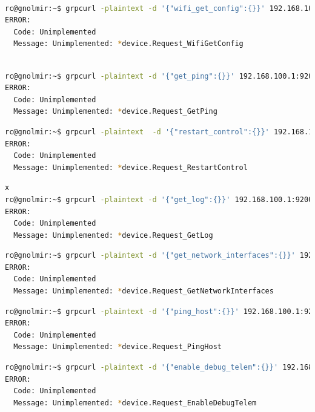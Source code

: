 \documentclass[IN,11pt,twoside,openright,bachelor,english]{tumthesis}
\begin{document}
\begin{lstlisting}[language=bash,basicstyle=\tiny]

rc@gnolmir:~$ grpcurl -plaintext -d '{"wifi_get_config":{}}' 192.168.100.1:9200 SpaceX.API.Device.Device/Handle
ERROR:
  Code: Unimplemented
  Message: Unimplemented: *device.Request_WifiGetConfig
\end{lstlisting}
\begin{lstlisting}[language=bash,basicstyle=\tiny]
 
rc@gnolmir:~$ grpcurl -plaintext -d '{"get_ping":{}}' 192.168.100.1:9200 SpaceX.API.Device.Device/Handle
ERROR:
  Code: Unimplemented
  Message: Unimplemented: *device.Request_GetPing
\end{lstlisting}

\begin{lstlisting}[language=bash,basicstyle=\tiny]
rc@gnolmir:~$ grpcurl -plaintext  -d '{"restart_control":{}}' 192.168.100.1:9200 SpaceX.API.Device.Device/Handle
ERROR:
  Code: Unimplemented
  Message: Unimplemented: *device.Request_RestartControl
\end{lstlisting}

\begin{lstlisting}[language=bash,basicstyle=\tiny]x
rc@gnolmir:~$ grpcurl -plaintext -d '{"get_log":{}}' 192.168.100.1:9200 SpaceX.API.Device.Device/Handle
ERROR:
  Code: Unimplemented
  Message: Unimplemented: *device.Request_GetLog
\end{lstlisting}

\begin{lstlisting}[language=bash,basicstyle=\tiny]
rc@gnolmir:~$ grpcurl -plaintext -d '{"get_network_interfaces":{}}' 192.168.100.1:9200 SpaceX.API.Device.Device/Handle
ERROR:
  Code: Unimplemented
  Message: Unimplemented: *device.Request_GetNetworkInterfaces
\end{lstlisting}

\begin{lstlisting}[language=bash,basicstyle=\tiny]
rc@gnolmir:~$ grpcurl -plaintext -d '{"ping_host":{}}' 192.168.100.1:9200 SpaceX.API.Device.Device/Handle
ERROR:
  Code: Unimplemented
  Message: Unimplemented: *device.Request_PingHost
\end{lstlisting}

\begin{lstlisting}[language=bash,basicstyle=\tiny]
rc@gnolmir:~$ grpcurl -plaintext -d '{"enable_debug_telem":{}}' 192.168.100.1:9200 SpaceX.API.Device.Device/Handle
ERROR:
  Code: Unimplemented
  Message: Unimplemented: *device.Request_EnableDebugTelem
\end{lstlisting}
\end{document}
